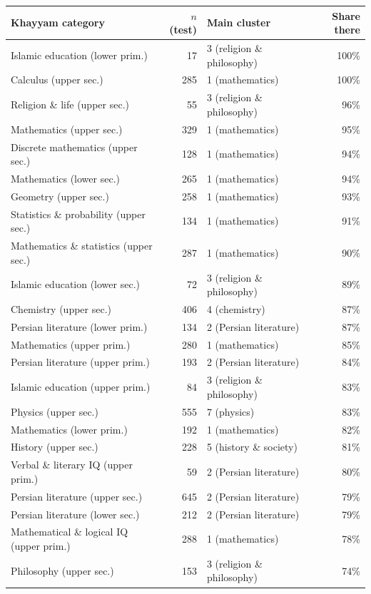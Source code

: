 \begin{longtable}{lrlr}
\toprule
Khayyam category & $n$ (test) & Main cluster & Share there \\
\midrule
\endhead
Islamic education (lower prim.) & 17 & 3 (religion \& philosophy) & 100\% \\
Calculus (upper sec.) & 285 & 1 (mathematics) & 100\% \\
Religion \& life (upper sec.) & 55 & 3 (religion \& philosophy) & 96\% \\
Mathematics (upper sec.) & 329 & 1 (mathematics) & 95\% \\
Discrete mathematics (upper sec.) & 128 & 1 (mathematics) & 94\% \\
Mathematics (lower sec.) & 265 & 1 (mathematics) & 94\% \\
Geometry (upper sec.) & 258 & 1 (mathematics) & 93\% \\
Statistics \& probability (upper sec.) & 134 & 1 (mathematics) & 91\% \\
Mathematics \& statistics (upper sec.) & 287 & 1 (mathematics) & 90\% \\
Islamic education (lower sec.) & 72 & 3 (religion \& philosophy) & 89\% \\
Chemistry (upper sec.) & 406 & 4 (chemistry) & 87\% \\
Persian literature (lower prim.) & 134 & 2 (Persian literature) & 87\% \\
Mathematics (upper prim.) & 280 & 1 (mathematics) & 85\% \\
Persian literature (upper prim.) & 193 & 2 (Persian literature) & 84\% \\
Islamic education (upper prim.) & 84 & 3 (religion \& philosophy) & 83\% \\
Physics (upper sec.) & 555 & 7 (physics) & 83\% \\
Mathematics (lower prim.) & 192 & 1 (mathematics) & 82\% \\
History (upper sec.) & 228 & 5 (history \& society) & 81\% \\
Verbal \& literary IQ (upper prim.) & 59 & 2 (Persian literature) & 80\% \\
Persian literature (upper sec.) & 645 & 2 (Persian literature) & 79\% \\
Persian literature (lower sec.) & 212 & 2 (Persian literature) & 79\% \\
Mathematical \& logical IQ (upper prim.) & 288 & 1 (mathematics) & 78\% \\
Philosophy (upper sec.) & 153 & 3 (religion \& philosophy) & 74\% \\

\end{longtable}
